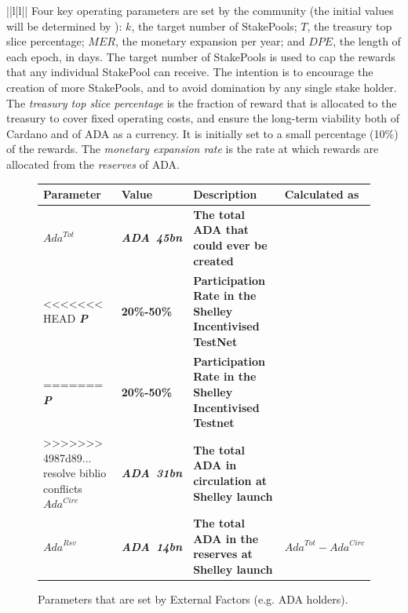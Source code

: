 \documentclass[11pt,a4paper,dvipsnames,twosided,final]{article}
\newcommand{\ada}{ADA{}}
\newcommand{\ADA}[1]{\textbf{\emph{\ada~{#1}}}}
\newcommand{\cardano}[1]{Cardano}
\begin{document}
\begin{tabular}{||l|l||}
\noindent
Four key operating parameters are set by the community (the initial values will be determined by \IOHK):
$k$, the target number of StakePools;
$T$, the treasury top slice percentage;
$\textit{MER}$, the monetary expansion per year;
and
$\textit{DPE}$, the length of each epoch, in days.
%
The target number of StakePools is used to cap the rewards that any individual StakePool can receive. The intention is to encourage the creation of more StakePools, and to avoid domination by any single stake holder.
The \emph{treasury top slice percentage} is the fraction of reward that is allocated to the treasury to cover fixed operating costs, and
ensure the long-term viability both of \cardano{} and of \ada{} as a currency.  It is initially set to a small percentage (10\%) of the rewards.
The \emph{monetary expansion rate} is the rate at which rewards are allocated from the \emph{reserves} of \ada{}.

\begin{figure}[h!]
\begin{center}
\begin{tabular}{||l|l|p{6cm}|l||}
  \hline \hline
\textbf{Parameter} & \textbf{Value} & \textbf{Description} & \textbf{Calculated as} \\\hline
\textbf{\color{blue} $\textit{Ada}^{Tot}$ } & \textbf{\color{blue}  \ADA{45bn} } & \textbf{\color{blue}  The total \ada{} that could ever be created } & \textbf{\color{blue}  } \\\hline
<<<<<<< HEAD
\textbf{\color{blue} \emph{P} } & \textbf{\color{blue}  20\%-50\% } & \textbf{\color{blue}  Participation Rate in the Shelley Incentivised TestNet } & \textbf{\color{blue}  } \\\hline
=======
\textbf{\color{blue} \emph{P} } & \textbf{\color{blue}  20\%-50\% } & \textbf{\color{blue}  Participation Rate in the Shelley Incentivised Testnet } & \textbf{\color{blue}  } \\\hline
>>>>>>> 4987d89... resolve biblio conflicts
\textbf{\color{blue} $\textit{Ada}^{\textit{Circ}}$ } & \textbf{\color{blue}  \ADA{31bn} } & \textbf{\color{blue}  The total \ada{} in circulation at Shelley launch } & \textbf{\color{blue}  } \\\hline
\textbf{\color{blue} $\textit{Ada}^{\textit{Rsv}}$ } & \textbf{\color{blue}  \ADA{14bn} } & \textbf{\color{blue}  The total \ada{} in the reserves at Shelley launch } & \textbf{\color{blue}  $\textit{Ada}^{Tot} - \textit{Ada}^{\textit{Circ}}$ } \\\hline
\hline
\end{tabular}
\end{center}
\caption{Parameters that are set by External Factors (e.g. \ada{} holders).}
\end{figure}


\end{tabular}
\end{document}
